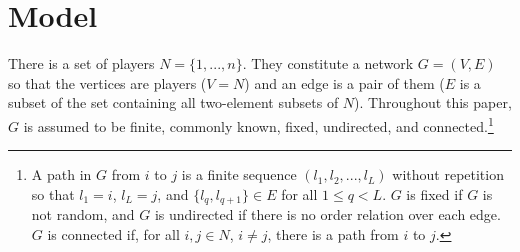 \documentclass[12pt,letter]{article}
\theoremstyle{definition}
\theoremstyle{remark}
\theoremstyle{claim}
\begin{document}
%
%
%
%

\section{Model}
\label{sec:model}


There is a set of players $N=\{1,...,n\}$. They constitute a network $G=(V,E)$ so that the vertices are players ($V=N$) and an edge is a pair of them ($E$ is a subset of the set containing all two-element subsets of $N$). Throughout this paper, $G$ is assumed to be finite, commonly known, fixed, undirected, and connected.\footnote{A path in $G$ from $i$ to $j$ is a finite sequence $(l_1,l_2,...,l_L)$ without repetition so that $l_1=i$, $l_L=j$, and $\{l_q,l_{q+1}\}\in E$ for all $1\leq q<L$. $G$ is fixed if $G$ is not random, and $G$ is undirected if there is no order relation over each edge. $G$ is connected if, for all $i,j\in N$, $i\neq j$, there is a path from $i$ to $j$.}
\end{document}
